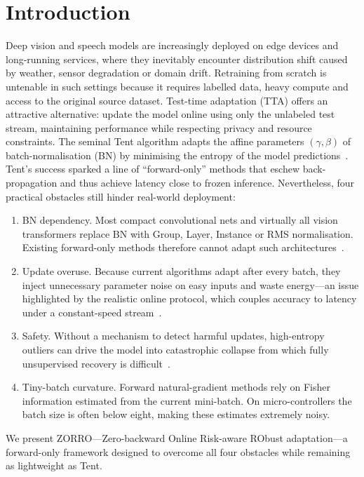 \documentclass{article} %
\begin{document}
\section{Introduction}
\label{sec:intro}%
Deep vision and speech models are increasingly deployed on edge devices and long-running services, where they inevitably encounter distribution shift caused by weather, sensor degradation or domain drift. Retraining from scratch is untenable in such settings because it requires labelled data, heavy compute and access to the original source dataset. Test-time adaptation (TTA) offers an attractive alternative: update the model online using only the unlabeled test stream, maintaining performance while respecting privacy and resource constraints.
The seminal Tent algorithm adapts the affine parameters \((\gamma, \beta)\) of batch-normalisation (BN) by minimising the entropy of the model predictions~\cite{wang-2020-tent}. Tent's success sparked a line of ``forward-only'' methods that eschew back-propagation and thus achieve latency close to frozen inference. Nevertheless, four practical obstacles still hinder real-world deployment:
\begin{enumerate}
\item BN dependency. Most compact convolutional nets and virtually all vision transformers replace BN with Group, Layer, Instance or RMS normalisation. Existing forward-only methods therefore cannot adapt such architectures~\cite{niu-2023-towards}.
\item Update overuse. Because current algorithms adapt after every batch, they inject unnecessary parameter noise on easy inputs and waste energy---an issue highlighted by the realistic online protocol, which couples accuracy to latency under a constant-speed stream~\cite{alfarra-2023-evaluation}.
\item Safety. Without a mechanism to detect harmful updates, high-entropy outliers can drive the model into catastrophic collapse from which fully unsupervised recovery is difficult~\cite{yuan-2023-robust,lee-2024-aetta}.
\item Tiny-batch curvature. Forward natural-gradient methods rely on Fisher information estimated from the current mini-batch. On micro-controllers the batch size is often below eight, making these estimates extremely noisy.
\end{enumerate}
We present ZORRO—Zero-backward Online Risk-aware RObust adaptation—a forward-only framework designed to overcome all four obstacles while remaining as lightweight as Tent.
\end{document}
